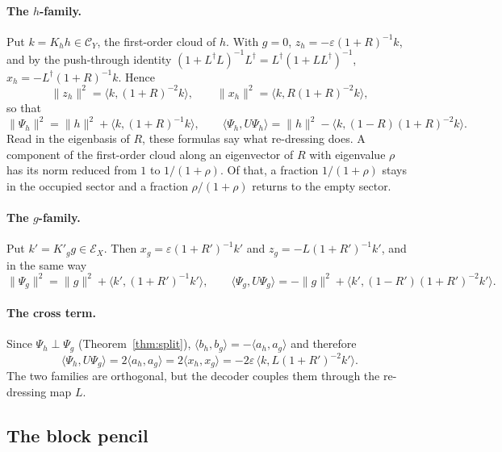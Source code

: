 \documentclass[11pt]{article}
\newcommand{\ip}[2]{\langle #1,#2\rangle}
\newcommand{\eps}{\varepsilon}
\newcommand{\Ec}{\mathcal E}
\newcommand{\Cc}{\mathcal C}
\newcommand{\Kh}{K_h}
\newcommand{\Kg}{{K'_g}}
\theoremstyle{plain}
\theoremstyle{remark}
\numberwithin{equation}{section}
\begin{document}
\paragraph{The $h$-family.} Put $k=\Kh h\in\Cc_Y$, the first-order cloud of $h$. With $g=0$,
$z_h=-\eps(1+R)^{-1}k$, and by the push-through identity $(1+L^\dagger L)^{-1}L^\dagger=L^\dagger(1+LL^\dagger)^{-1}$,
$x_h=-L^\dagger(1+R)^{-1}k$. Hence
\begin{equation}\label{eq:hfam}
\|z_h\|^2=\ip{k}{(1+R)^{-2}k},\qquad \|x_h\|^2=\ip{k}{R(1+R)^{-2}k},
\end{equation}
so that
\begin{equation}\label{eq:hfam2}
\|\Psi_h\|^2=\|h\|^2+\ip{k}{(1+R)^{-1}k},\qquad \ip{\Psi_h}{U\Psi_h}=\|h\|^2-\ip{k}{(1-R)(1+R)^{-2}k}.
\end{equation}
Read in the eigenbasis of $R$, these formulas say what re-dressing does. A component of the first-order cloud along an
eigenvector of $R$ with eigenvalue $\rho$ has its norm reduced from $1$ to $1/(1+\rho)$. Of that, a fraction $1/(1+\rho)$
stays in the occupied sector and a fraction $\rho/(1+\rho)$ returns to the empty sector.

\paragraph{The $g$-family.} Put $k'=\Kg g\in\Ec_X$. Then $x_g=\eps(1+R')^{-1}k'$ and $z_g=-L(1+R')^{-1}k'$, and in the
same way
\begin{equation}\label{eq:gfam}
\|\Psi_g\|^2=\|g\|^2+\ip{k'}{(1+R')^{-1}k'},\qquad \ip{\Psi_g}{U\Psi_g}=-\|g\|^2+\ip{k'}{(1-R')(1+R')^{-2}k'}.
\end{equation}

\paragraph{The cross term.} Since $\Psi_h\perp\Psi_g$ (Theorem~\ref{thm:split}), $\ip{b_h}{b_g}=-\ip{a_h}{a_g}$ and
therefore
\begin{equation}\label{eq:cross}
\ip{\Psi_h}{U\Psi_g}=2\ip{a_h}{a_g}=2\ip{x_h}{x_g}=-2\eps\,\ip{k}{L(1+R')^{-2}k'} .
\end{equation}
The two families are orthogonal, but the decoder couples them through the re-dressing map $L$.

\subsection{The block pencil}
\end{document}
